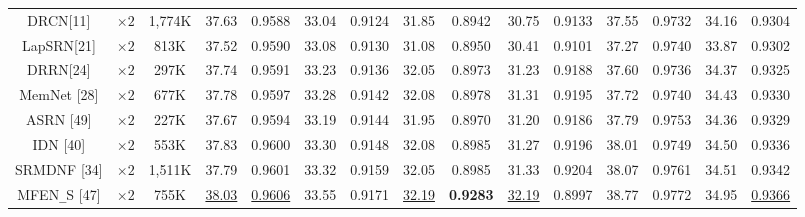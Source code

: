 \documentclass{ieeeaccess}
\begin{document}
\begin{table}
\begin{tabular}{|c|c|c|cc|cc|cc|cc|cc|cc|}
DRCN[11]& $\times 2$&1,774K& \multicolumn{1}{c|}{37.63} & 0.9588 & \multicolumn{1}{c|}{33.04} &0.9124 &\multicolumn{1}{c|}{31.85} & 0.8942& \multicolumn{1}{c|}{30.75} &0.9133 & \multicolumn{1}{c|}{37.55} & 0.9732
&\multicolumn{1}{c|}{34.16} & 0.9304\\


LapSRN[21] & $\times 2$&813K& \multicolumn{1}{c|}{37.52} & 0.9590 & \multicolumn{1}{c|}{33.08} & 0.9130 &\multicolumn{1}{c|}{31.08} & 0.8950 & \multicolumn{1}{c|}{30.41} &  0.9101 & \multicolumn{1}{c|}{37.27} &  0.9740
&\multicolumn{1}{c|}{33.87} & 0.9302\\

DRRN[24]& $\times 2$&297K& \multicolumn{1}{c|}{37.74} &  0.9591  & \multicolumn{1}{c|}{33.23 } & 0.9136  &\multicolumn{1}{c|}{32.05} & 0.8973 & \multicolumn{1}{c|}{31.23} & 0.9188 & \multicolumn{1}{c|}{37.60} & 0.9736
&\multicolumn{1}{c|}{34.37} &0.9325\\


MemNet [28] & $\times 2$&677K& \multicolumn{1}{c|}{37.78} & 0.9597  & \multicolumn{1}{c|}{33.28} &0.9142  &\multicolumn{1}{c|}{32.08} & 0.8978 & \multicolumn{1}{c|}{31.31} &0.9195  & \multicolumn{1}{c|}{37.72} &0.9740
&\multicolumn{1}{c|}{34.43} &0.9330\\


ASRN [49]& $\times 2$&227K& \multicolumn{1}{c|}{37.67} &0.9594 & \multicolumn{1}{c|}{33.19} & 0.9144 &\multicolumn{1}{c|}{31.95} &0.8970& \multicolumn{1}{c|}{31.20} &0.9186 & \multicolumn{1}{c|}{37.79} & 0.9753
&\multicolumn{1}{c|}{34.36} &0.9329\\

IDN [40] & $\times 2$&553K& \multicolumn{1}{c|}{37.83} & 0.9600 & \multicolumn{1}{c|}{33.30} & 0.9148  &\multicolumn{1}{c|}{32.08} & 0.8985 & \multicolumn{1}{c|}{31.27} & 0.9196  & \multicolumn{1}{c|}{38.01} & 0.9749
&\multicolumn{1}{c|}{34.50} &0.9336\\


SRMDNF [34] & $\times 2$&1,511K& \multicolumn{1}{c|}{37.79} & 0.9601  & \multicolumn{1}{c|}{33.32} & 0.9159  &\multicolumn{1}{c|}{32.05} & 0.8985 & \multicolumn{1}{c|}{31.33} &0.9204& \multicolumn{1}{c|}{38.07} & 0.9761
&\multicolumn{1}{c|}{34.51} &0.9342\\


MFEN\texttt{\_}S [47] & $\times 2$&755K& \multicolumn{1}{c|}{\color{blue}\underline{38.03}} & {\color{blue}\underline{0.9606}} & \multicolumn{1}{c|}{33.55} & 0.9171  &\multicolumn{1}{c|}{\color{blue}\underline{32.19}} &{\color{red}\textbf{0.9283}} & \multicolumn{1}{c|}{\color{blue}\underline{32.19}} & 0.8997 & \multicolumn{1}{c|}{38.77} &0.9772
&\multicolumn{1}{c|}{34.95} & {\color{blue}\underline{0.9366}}\\



\end{tabular}
\end{table}
\end{document}

